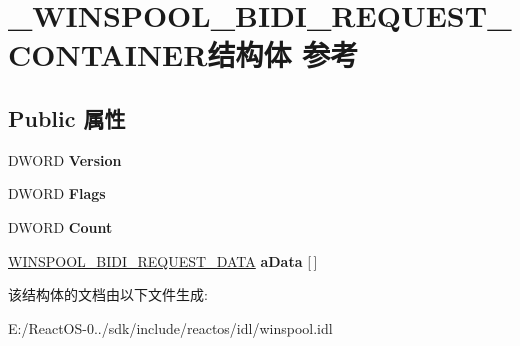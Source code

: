 \hypertarget{struct___w_i_n_s_p_o_o_l___b_i_d_i___r_e_q_u_e_s_t___c_o_n_t_a_i_n_e_r}{}\section{\+\_\+\+W\+I\+N\+S\+P\+O\+O\+L\+\_\+\+B\+I\+D\+I\+\_\+\+R\+E\+Q\+U\+E\+S\+T\+\_\+\+C\+O\+N\+T\+A\+I\+N\+E\+R结构体 参考}
\label{struct___w_i_n_s_p_o_o_l___b_i_d_i___r_e_q_u_e_s_t___c_o_n_t_a_i_n_e_r}
\subsection*{Public 属性}
\begin{DoxyCompactItemize}
\item 
\mbox{\label{struct___w_i_n_s_p_o_o_l___b_i_d_i___r_e_q_u_e_s_t___c_o_n_t_a_i_n_e_r_a0b5ee4c62a84287c8f8f952330f5d2ab}} 
D\+W\+O\+RD {\bfseries Version}
\item 
\mbox{\label{struct___w_i_n_s_p_o_o_l___b_i_d_i___r_e_q_u_e_s_t___c_o_n_t_a_i_n_e_r_a82c2ac0b8b08ae695b92941626bc7db4}} 
D\+W\+O\+RD {\bfseries Flags}
\item 
\mbox{\label{struct___w_i_n_s_p_o_o_l___b_i_d_i___r_e_q_u_e_s_t___c_o_n_t_a_i_n_e_r_a9bddafc74c84e1498ab6370e13ca5316}} 
D\+W\+O\+RD {\bfseries Count}
\item 
\mbox{\label{struct___w_i_n_s_p_o_o_l___b_i_d_i___r_e_q_u_e_s_t___c_o_n_t_a_i_n_e_r_ad8686ec55ee8bc3375768d6536da0319}} 
\hyperlink{struct___w_i_n_s_p_o_o_l___b_i_d_i___r_e_q_u_e_s_t___d_a_t_a}{W\+I\+N\+S\+P\+O\+O\+L\+\_\+\+B\+I\+D\+I\+\_\+\+R\+E\+Q\+U\+E\+S\+T\+\_\+\+D\+A\+TA} {\bfseries a\+Data} \mbox{[}$\,$\mbox{]}
\end{DoxyCompactItemize}


该结构体的文档由以下文件生成\+:\begin{DoxyCompactItemize}
\item 
E\+:/\+React\+O\+S-\/0../sdk/include/reactos/idl/winspool.\+idl\end{DoxyCompactItemize}
